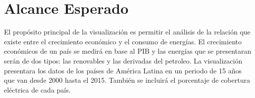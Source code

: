 \documentclass{article}
\begin{document}
\section{Alcance Esperado}

El propósito principal de la visualización es permitir el análisis de la relación que existe entre el crecimiento económico y el consumo de energías. El crecimiento económicos de un país se medirá en base al PIB y las energías que se presentaran serán de dos tipos: las renovables y las derivadas del petroleo. La visualización presentara los datos de los países de América Latina en un periodo de 15 años que van desde 2000 hasta el 2015. También se incluirá el porcentaje de cobertura eléctrica de cada país.

%
%
\end{document}
